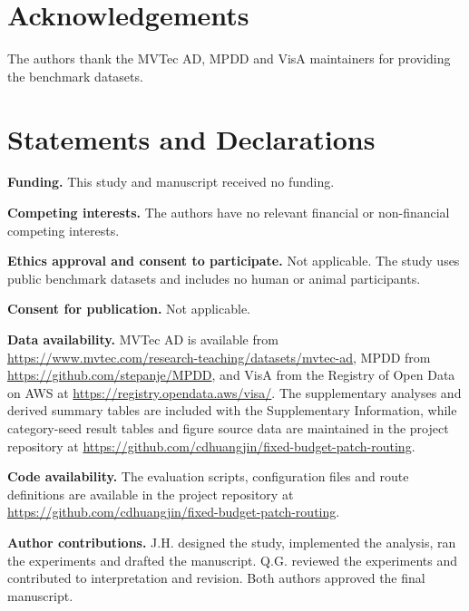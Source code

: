 \documentclass[iicol,pdflatex,sn-basic,Numbered]{sn-jnl}
\begin{document}
\backmatter

\section*{Acknowledgements}
The authors thank the MVTec AD, MPDD and VisA maintainers for providing the benchmark datasets.

\section*{Statements and Declarations}
\textbf{Funding.} This study and manuscript received no funding.

\textbf{Competing interests.} The authors have no relevant financial or non-financial competing interests.

\textbf{Ethics approval and consent to participate.} Not applicable. The study uses public benchmark datasets and includes no human or animal participants.

\textbf{Consent for publication.} Not applicable.

\textbf{Data availability.} MVTec AD is available from \url{https://www.mvtec.com/research-teaching/datasets/mvtec-ad}, MPDD from \url{https://github.com/stepanje/MPDD}, and VisA from the Registry of Open Data on AWS at \url{https://registry.opendata.aws/visa/}. The supplementary analyses and derived summary tables are included with the Supplementary Information, while category-seed result tables and figure source data are maintained in the project repository at \url{https://github.com/cdhuangjin/fixed-budget-patch-routing}.

\textbf{Code availability.} The evaluation scripts, configuration files and route definitions are available in the project repository at \url{https://github.com/cdhuangjin/fixed-budget-patch-routing}.

\textbf{Author contributions.} J.H. designed the study, implemented the analysis, ran the experiments and drafted the manuscript. Q.G. reviewed the experiments and contributed to interpretation and revision. Both authors approved the final manuscript.


\end{document}
